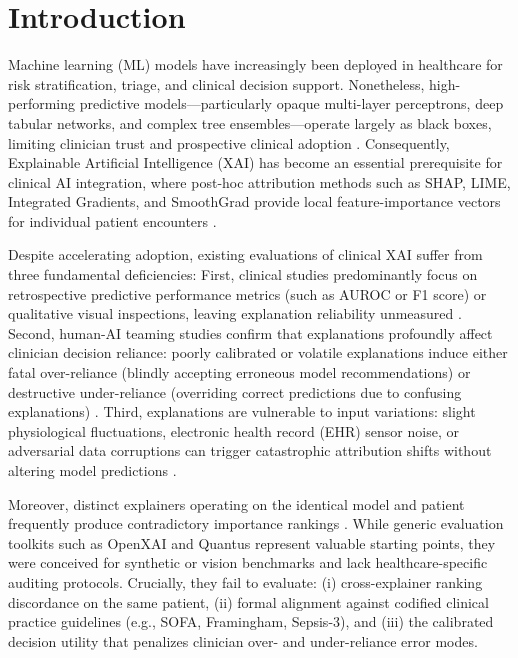 \documentclass[3p,times,procedia]{elsarticle}
\theoremstyle{definition}
\begin{document}
\section{Introduction}

Machine learning (ML) models have increasingly been deployed in healthcare for risk stratification, triage, and clinical decision support. Nonetheless, high-performing predictive models—particularly opaque multi-layer perceptrons, deep tabular networks, and complex tree ensembles—operate largely as black boxes, limiting clinician trust and prospective clinical adoption \cite{muhammad2024unveiling,ali2023enlightening,jung2023essential}. Consequently, Explainable Artificial Intelligence (XAI) has become an essential prerequisite for clinical AI integration, where post-hoc attribution methods such as SHAP, LIME, Integrated Gradients, and SmoothGrad provide local feature-importance vectors for individual patient encounters \cite{caruana2015intelligible,ribeiro2016why,lundberg2017unified,sundararajan2017axiomatic}.

Despite accelerating adoption, existing evaluations of clinical XAI suffer from three fundamental deficiencies:
First, clinical studies predominantly focus on retrospective predictive performance metrics (such as AUROC or F1 score) or qualitative visual inspections, leaving explanation reliability unmeasured \cite{jung2023essential,roychowdhury2025evaluation,kyrimi2025explanation}. Second, human-AI teaming studies confirm that explanations profoundly affect clinician decision reliance: poorly calibrated or volatile explanations induce either fatal over-reliance (blindly accepting erroneous model recommendations) or destructive under-reliance (overriding correct predictions due to confusing explanations) \cite{pauker1980threshold,bussone2015trust,jacobs2021designing,naiseh2023trust,nicolson2025human}. Third, explanations are vulnerable to input variations: slight physiological fluctuations, electronic health record (EHR) sensor noise, or adversarial data corruptions can trigger catastrophic attribution shifts without altering model predictions \cite{alvarezmelis2018towards,sun2023patch,baniecki2024adversarial,repetto2026robustness}.

Moreover, distinct explainers operating on the identical model and patient frequently produce contradictory importance rankings \cite{krishna2022disagreement,mitrut2024clarity}. While generic evaluation toolkits such as OpenXAI \cite{agarwal2022openxai} and Quantus \cite{hedstrom2023quantus} represent valuable starting points, they were conceived for synthetic or vision benchmarks and lack healthcare-specific auditing protocols. Crucially, they fail to evaluate: (i) cross-explainer ranking discordance on the same patient, (ii) formal alignment against codified clinical practice guidelines (e.g., SOFA, Framingham, Sepsis-3), and (iii) the calibrated decision utility that penalizes clinician over- and under-reliance error modes.
\end{document}
